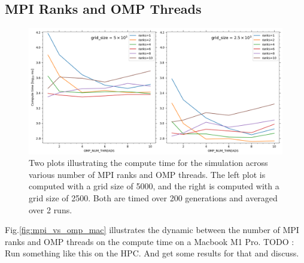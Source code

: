     \subsection{MPI Ranks and OMP Threads}\label{subsec:mpi-omp}
    \begin{figure}[htb]
    \centering
    \includegraphics[width=1\textwidth]{./figures/mpi_vs_omp_mac}
    \caption{Two plots illustrating the compute time for the simulation across various number of MPI ranks and OMP threads.
        The left plot is computed with a grid size of 5000, and the right is computed with a grid size of 2500. Both are
        timed over 200 generations and averaged over 2 runs.}
    \label{fig:mpi_vs_omp_mac}
    \end{figure}

    Fig.\eqref{fig:mpi_vs_omp_mac} illustrates the dynamic between the number of MPI ranks and OMP threads on the compute time
    on a Macbook M1 Pro.
    TODO : Run something like this on the HPC. And get some results for that and discuss.





